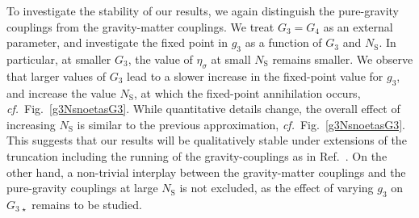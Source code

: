 \documentclass[11pt]{book}
\newcommand\NS{ N_{\scriptscriptstyle{\mathrm{S}}} }
\newcommand\cf{\textit{cf.}\ }
\numberwithin{equation}{chapter}
\begin{document}
To investigate the stability of our results,
we again distinguish the pure-gravity couplings from the gravity-matter couplings.
We treat $G_3=G_4$ as an external parameter,
and investigate the fixed point in $g_3$ as a function of $G_3$ and $\NS$.
In particular, at smaller $G_3$, the value of $\eta_{\sigma}$ at small $\NS$ remains smaller.
We observe that larger values of $G_3$ lead to a slower increase in the fixed-point value for $g_3$,
and increase the value $\NS$, at which the fixed-point annihilation occurs,
\cf Fig.~\ref{g3NsnoetasG3}.
While quantitative details change, the overall effect of increasing $\NS$ is similar to
the previous approximation, \cf Fig.~\ref{g3NsnoetasG3}.
This suggests that our results will be qualitatively stable under extensions of the truncation
including the running of the gravity-couplings as in Ref.~\cite{Meibohm:2015twa}.
On the other hand, a non-trivial interplay between the gravity-matter couplings
and the pure-gravity couplings at large $\NS$ is not excluded,
as the effect of varying $g_3$ on $G_{3\,\star}$  remains to be studied.
\end{document}
